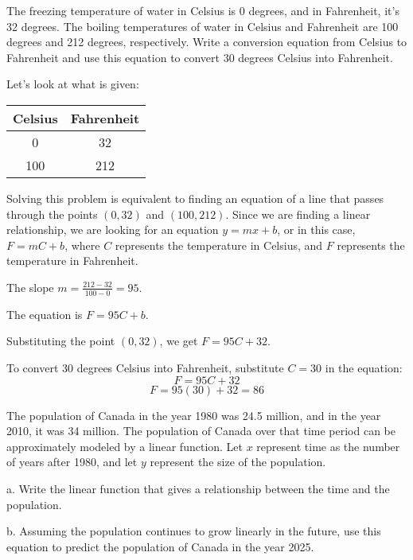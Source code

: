 \begin{example}
The freezing temperature of water in Celsius is 0 degrees, and in Fahrenheit, it's 32 degrees. The boiling temperatures of water in Celsius and Fahrenheit are 100 degrees and 212 degrees, respectively. Write a conversion equation from Celsius to Fahrenheit and use this equation to convert 30 degrees Celsius into Fahrenheit.
\end{example}

\begin{solution}
Let's look at what is given:

\begin{center}
\begin{tabular}{|c|c|}
\hline
Celsius & Fahrenheit \\
\hline
0 & 32 \\
100 & 212 \\
\hline
\end{tabular}
\end{center}

Solving this problem is equivalent to finding an equation of a line that passes through the points $(0, 32)$ and $(100, 212)$. Since we are finding a linear relationship, we are looking for an equation $y = mx + b$, or in this case, $F = mC + b$, where $C$ represents the temperature in Celsius, and $F$ represents the temperature in Fahrenheit.

The slope $m = \frac{212 - 32}{100 - 0} = 95$.

The equation is $F = 95C + b$.

Substituting the point $(0, 32)$, we get $F = 95C + 32$.

To convert 30 degrees Celsius into Fahrenheit, substitute $C = 30$ in the equation:
\[F = 95C + 32\]
\[F = 95(30) + 32 = 86\]
\end{solution}

\begin{example}
The population of Canada in the year 1980 was 24.5 million, and in the year 2010, it was 34 million. The population of Canada over that time period can be approximately modeled by a linear function. Let $x$ represent time as the number of years after 1980, and let $y$ represent the size of the population.

a. Write the linear function that gives a relationship between the time and the population.

b. Assuming the population continues to grow linearly in the future, use this equation to predict the population of Canada in the year 2025.
\end{example}

